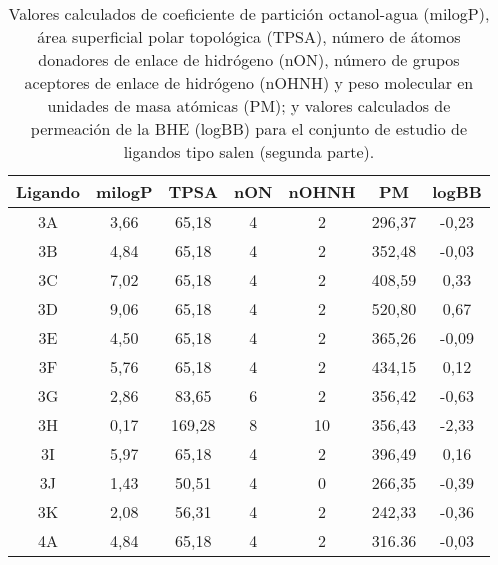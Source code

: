 \begin{table}[h]
\centering
\caption{Valores calculados de coeficiente de partición octanol-agua (milogP), área superficial polar topológica (TPSA), número de átomos donadores de enlace de hidrógeno (nON), número de grupos aceptores de enlace de hidrógeno (nOHNH) y peso molecular en unidades de masa atómicas (PM); y valores calculados de permeación de la BHE (logBB) para el conjunto de estudio de ligandos tipo salen (segunda parte).}
\begin{tabular}{c|ccccc|c}
\hline
\textbf{Ligando} & \textbf{milogP} & \textbf{TPSA} & \textbf{nON} & \textbf{nOHNH} & \textbf{PM} & \textbf{logBB} \\ \hline
3A               & 3,66             & 65,18         & 4            & 2              & 296,37      & -0,23          \\
3B               & 4,84             & 65,18         & 4            & 2              & 352,48      & -0,03          \\
3C               & 7,02             & 65,18         & 4            & 2              & 408,59      & 0,33           \\
3D               & 9,06             & 65,18         & 4            & 2              & 520,80      & 0,67           \\
3E               & 4,50             & 65,18         & 4            & 2              & 365,26      & -0,09          \\
3F               & 5,76             & 65,18         & 4            & 2              & 434,15      & 0,12           \\
3G               & 2,86             & 83,65         & 6            & 2              & 356,42      & -0,63          \\
3H               & 0,17             & 169,28        & 8            & 10             & 356,43      & -2,33          \\
3I               & 5,97             & 65,18         & 4            & 2              & 396,49      & 0,16           \\
3J               & 1,43             & 50,51         & 4            & 0              & 266,35      & -0,39          \\
3K               & 2,08             & 56,31         & 4            & 2              & 242,33      & -0,36          \\
4A               & 4,84             & 65,18         & 4            & 2              & 316.36      & -0,03          \\

\end{tabular}
\end{table}
